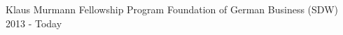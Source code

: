 \begin{cvhonors}

  \cvhonor
    {Klaus Murmann Fellowship Program} %
    {Foundation of German Business (SDW)} %
    {} %
    {2013 - Today} %

\end{cvhonors}

